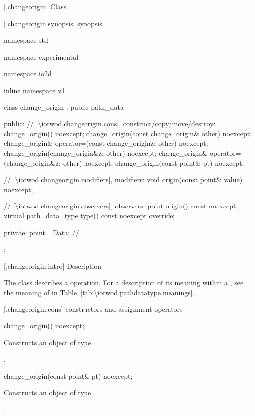  [\iotwod.changeorigin] {Class }

 [\iotwod.changeorigin.synopsis] { synopsis}

\begin{codeblock}
namespace std { namespace experimental { namespace io2d { inline namespace v1 {
  class change_origin : public path_data {
  public:
    // \ref{\iotwod.changeorigin.cons}, construct/copy/move/destroy:
    change_origin() noexcept;
    change_origin(const change_origin& other) noexcept;
    change_origin& operator=(const change_origin& other) noexcept;
    change_origin(change_origin&& other) noexcept;
    change_origin& operator=(change_origin&& other) noexcept;
    change_origin(const point& pt) noexcept;

    // \ref{\iotwod.changeorigin.modifiers}, modifiers:
    void origin(const point& value) noexcept;

    // \ref{\iotwod.changeorigin.observers}, observers:
    point origin() const noexcept;
    virtual path_data_type type() const noexcept override;
    
  private:
    point _Data; // \expos
  };
} } } }
\end{codeblock}

 [\iotwod.changeorigin.intro] { Description}

\pnum
{}
The class  describes a  operation. For a description of its meaning within a , see the meaning of  in Table~\ref{tab:\iotwod.pathdatatype.meanings}.

 [\iotwod.changeorigin.cons] { constructors and assignment operators}

\begin{itemdecl}
    change_origin() noexcept;
\end{itemdecl}
\begin{itemdescr}
	\pnum
	\effects
	Constructs an object of type .
	
	\pnum
	\postconditions
	.
\end{itemdescr}

\begin{itemdecl}
    change_origin(const point& pt) noexcept;
\end{itemdecl}
\begin{itemdescr}
	\pnum
	\effects
	Constructs an object of type .
	
	\pnum
	\postconditions
	.
\end{itemdescr}

